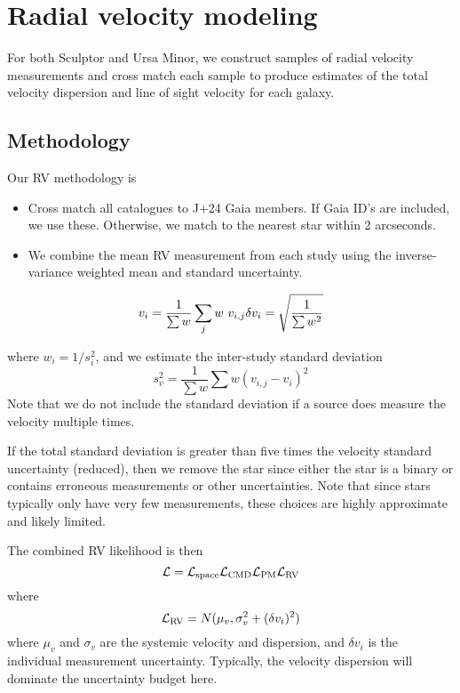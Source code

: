 \section{Radial velocity modeling}\label{radial-velocity-modeling}

For both Sculptor and Ursa Minor, we construct samples of radial
velocity measurements and cross match each sample to produce estimates
of the total velocity dispersion and line of sight velocity for each
galaxy.

\subsection{Methodology}\label{methodology}

Our RV methodology is

\begin{itemize}
\tightlist
\item
  Cross match all catalogues to J+24 Gaia members. If Gaia ID's are
  included, we use these. Otherwise, we match to the nearest star within
  2 arcseconds.
\item
  We combine the mean RV measurement from each study using the
  inverse-variance weighted mean and standard uncertainty.
\end{itemize}

\[
v_i = \frac{1}{\sum w}\sum_j w\ v_{i, j} \\
\delta v_i = \sqrt{\frac{1}{\sum w^2}}
\]

where \(w_i = 1/s_i^2\), and we estimate the inter-study standard
deviation \[
s_{v}^2 = \frac{1}{\sum w} \sum w (v_{i, j} - v_i)^2
\] Note that we do not include the standard deviation if a source does
measure the velocity multiple times.

If the total standard deviation is greater than five times the velocity
standard uncertainty (reduced), then we remove the star since either the
star is a binary or contains erroneous measurements or other
uncertainties. Note that since stars typically only have very few
measurements, these choices are highly approximate and likely limited.

The combined RV likelihood is then \[
{\cal L} = {\cal L}_{\rm space} {\cal L}_{\rm CMD} {\cal L}_{\rm PM} {\cal L}_{\rm RV}
\] where \[
{\cal L}_{\rm RV} = N(\mu_{v}, \sigma_{v}^2 + (\delta v_i)^2)
\] where \(\mu_v\) and \(\sigma_v\) are the systemic velocity and
dispersion, and \(\delta v_i\) is the individual measurement
uncertainty. Typically, the velocity dispersion will dominate the
uncertainty budget here.


